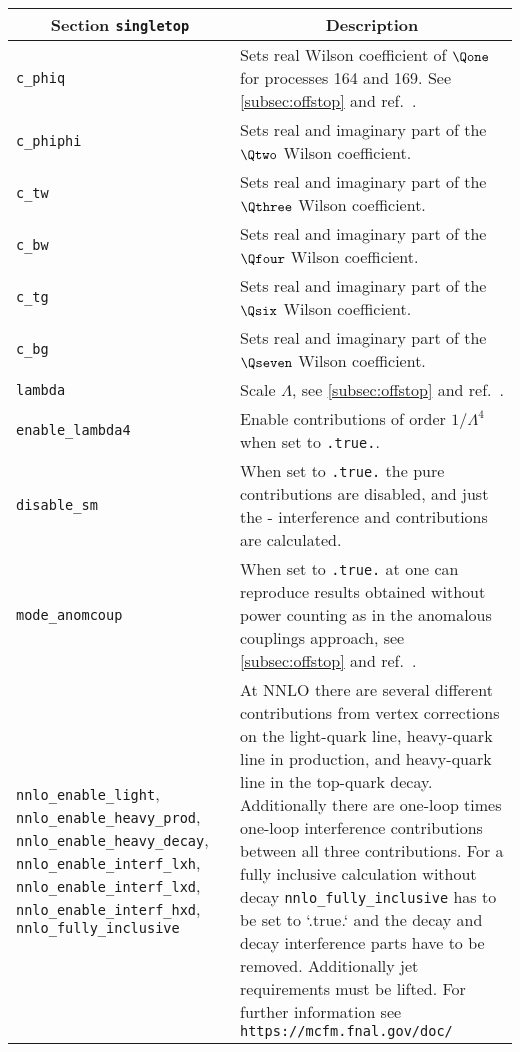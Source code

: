 	\begin{longtable}{p{4.5cm}p{10.5cm}}
		\toprule
		\multicolumn{1}{c}{{\textbf{Section} \texttt{singletop}}} & \multicolumn{1}{c}{{\textbf{Description}}} \\ 
		\midrule
		\texttt{c\_phiq} & Sets real Wilson coefficient of $\Qone$ for processes 164 and 169. See \cref{subsec:offstop} 
		and ref.~\cite{Neumann:2019kvk}. \\
		\texttt{c\_phiphi} & Sets real and imaginary part of the $\Qtwo$ Wilson coefficient. \\
		\texttt{c\_tw} & Sets real and imaginary part of the $\Qthree$ Wilson coefficient. \\
		\texttt{c\_bw} & Sets real and imaginary part of the $\Qfour$ Wilson coefficient. \\
		\texttt{c\_tg} & Sets real and imaginary part of the $\Qsix$ Wilson coefficient. \\
		\texttt{c\_bg} & Sets real and imaginary part of the $\Qseven$ Wilson coefficient. \\
		\texttt{lambda} & Scale $\Lambda$, see \cref{subsec:offstop} and ref.~\cite{Neumann:2019kvk}. \\
		\texttt{enable\_lambda4} & Enable contributions of order $1/\Lambda^4$ when set to \texttt{.true.}. \\
		\texttt{disable\_sm} & When set to \texttt{.true.} the pure \SM{} contributions are disabled, and just
		the \SM{}-\EFT{} interference and \EFT{} contributions are calculated. \\
		\texttt{mode\_anomcoup} & When set to \texttt{.true.} at \LO{} one can reproduce results obtained
			without power counting as in the anomalous couplings approach, see \cref{subsec:offstop} and 
			ref.~\cite{Neumann:2019kvk}. \\
               \texttt{nnlo\_enable\_light},
               \texttt{nnlo\_enable\_heavy\_prod},
               \texttt{nnlo\_enable\_heavy\_decay},
               \texttt{nnlo\_enable\_interf\_lxh},
               \texttt{nnlo\_enable\_interf\_lxd},
               \texttt{nnlo\_enable\_interf\_hxd},
               \texttt{nnlo\_fully\_inclusive}&
               At NNLO there are several different contributions from vertex
               corrections on the light-quark line, heavy-quark line in production, and
               heavy-quark line in the top-quark decay. Additionally there are one-loop
               times one-loop interference contributions between all three
               contributions. For a fully inclusive calculation without decay
	       \texttt{nnlo\_fully\_inclusive}  has to
               be set to `.true.` and the decay and decay interference parts have to be
               removed.	 Additionally jet requirements must be lifted.  For further information see
	       \texttt{https://mcfm.fnal.gov/doc/}      \\
    \bottomrule
	\end{longtable}

 

